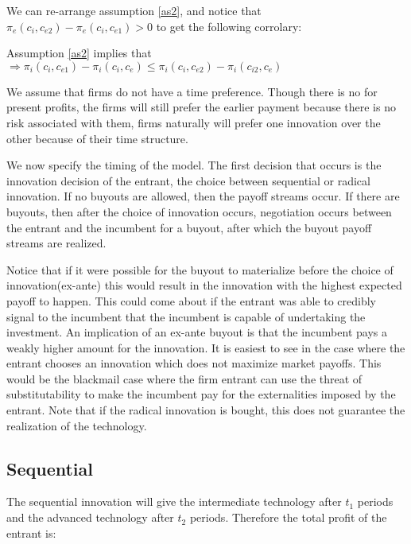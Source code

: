 We can re-arrange assumption \ref{as2}, and notice that $\pi_{e}(c_{i},c_{e2})-\pi_{e}(c_{i},c_{e1})>0$ to get the following corrolary:

\begin{corollary}\label{cor}
Assumption \ref{as2} implies that $\Rightarrow \pi_{i}(c_{i},c_{e1}) - \pi_{i}(c_{i},c_{e}) \leq \pi_{i}(c_{i},c_{e2}) - \pi_{i}(c_{i2},c_{e})$ 
\end{corollary}


We assume that firms do not have a time preference. Though there is no  for present profits, the firms will still prefer the earlier payment because there is no risk associated with them, firms naturally will prefer one innovation over the other because of their time structure. 

We now specify the timing of the model. The first decision that occurs is the innovation decision of the entrant, the choice between sequential or radical innovation. If no buyouts are allowed, then the payoff streams occur. If there are buyouts, then after the choice of innovation occurs, negotiation occurs between the entrant and the incumbent for a buyout, after which the buyout payoff streams are realized.

Notice that if it were possible for the buyout to materialize before the choice of innovation(ex-ante) this would result in the innovation with the highest expected payoff to happen. This could come about if the entrant was able to credibly signal to the incumbent that the incumbent is capable of undertaking the investment. An implication of an ex-ante buyout is that the incumbent pays a weakly higher amount for the innovation. It is easiest to see in the case where the entrant chooses an innovation which does not maximize market payoffs. This would be the blackmail case where the firm entrant can use the threat of substitutability to make the incumbent pay for the externalities imposed by the entrant. Note that if the radical innovation is bought, this does not guarantee the realization of the technology. 

\subsection{Sequential}

The sequential innovation will give the intermediate technology after $t_1$ periods and the advanced technology after $t_2$ periods. Therefore the total profit of the entrant is: 

